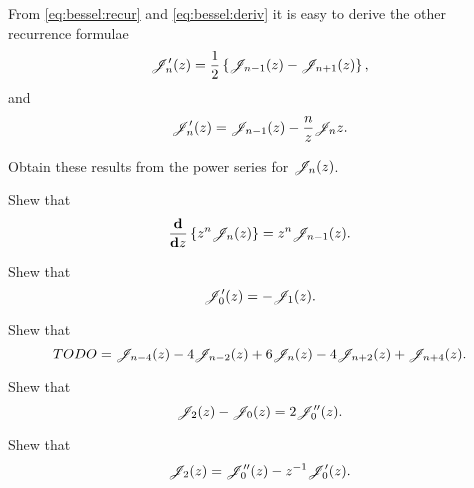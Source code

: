 From \eqref{eq:bessel:recur} and \eqref{eq:bessel:deriv} it is easy to
derive the other recurrence formulae
\begin{equation}
  \mathscr{J}'_{n}(z) = \frac{1}{2} \left\{  \mathscr{J}_{n-1}(z) - \mathscr{J}_{n+1}(z)   \right\},
\end{equation}
and
\begin{equation}
  \mathscr{J}'_{n}(z) = \mathscr{J}_{n-1}(z) - \frac{n}{z} \mathscr{J}_{n}{z}.
\end{equation}
\begin{wandwexample}
  Obtain these results from the power series for $\mathscr{J}_{n}(z)$.
\end{wandwexample}
\begin{wandwexample}
  Shew that
  $$
  \frac{\mathbf{d}}{\mathbf{d} z} \left\{  z^{n} \mathscr{J}_{n}(z)  \right\} = z^{n} \mathscr{J}_{n-1}(z).
  $$
\end{wandwexample}
\begin{wandwexample}
  Shew that
  $$
  \mathscr{J}'_{0}(z) = -\mathscr{J}_{1}(z).
  $$
\end{wandwexample}
\begin{wandwexample}
  Shew that
  $$
  TODO = \mathscr{J}_{n-4}(z) - 4 \mathscr{J}_{n-2}(z) + 6 \mathscr{J}_{n}(z) - 4 \mathscr{J}_{n+2}(z) + \mathscr{J}_{n+4}(z).
  $$
\end{wandwexample}
\begin{wandwexample}
  Shew that
  $$
  \mathscr{J}_{2}(z) - \mathscr{J}_{0}(z) = 2 \mathscr{J}''_{0}(z).
  $$
\end{wandwexample}
\begin{wandwexample}
  Shew that
  $$
  \mathscr{J}_{2}(z) = \mathscr{J}''_{0}(z) - z^{-1} \mathscr{J}'_{0}(z).
  $$
\end{wandwexample}

